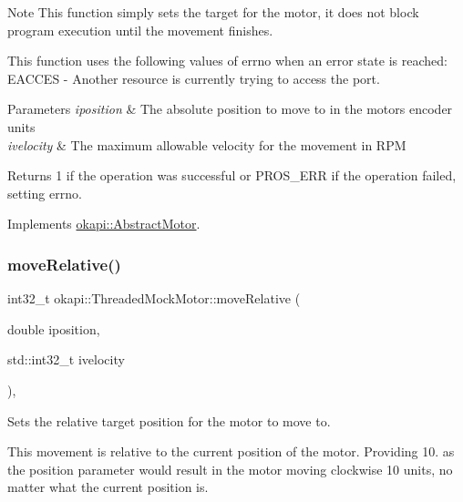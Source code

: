 \begin{DoxyNote}{Note}
This function simply sets the target for the motor, it does not block program execution until the movement finishes.
\end{DoxyNote}
This function uses the following values of errno when an error state is reached\+: E\+A\+C\+C\+ES -\/ Another resource is currently trying to access the port.


\begin{DoxyParams}{Parameters}
{\em iposition} & The absolute position to move to in the motor\textquotesingle{}s encoder units \\
\hline
{\em ivelocity} & The maximum allowable velocity for the movement in R\+PM \\
\hline
\end{DoxyParams}
\begin{DoxyReturn}{Returns}
1 if the operation was successful or P\+R\+O\+S\+\_\+\+E\+RR if the operation failed, setting errno. 
\end{DoxyReturn}


Implements \mbox{\hyperlink{classokapi_1_1AbstractMotor_ab84ff0f3e39fa14dcf74bcc867863ff8}{okapi\+::\+Abstract\+Motor}}.

\mbox{\label{classokapi_1_1ThreadedMockMotor_a3431a448097d84997a8d727f6be2ceac}} 
\subsubsection{\texorpdfstring{moveRelative()}{moveRelative()}}
{\footnotesize\ttfamily int32\+\_\+t okapi\+::\+Threaded\+Mock\+Motor\+::move\+Relative (\begin{DoxyParamCaption}\item[{double}]{iposition,  }\item[{std\+::int32\+\_\+t}]{ivelocity }\end{DoxyParamCaption})\hspace{0.3cm}{\ttfamily [override]}, {\ttfamily [virtual]}}



Sets the relative target position for the motor to move to. 

This movement is relative to the current position of the motor. Providing 10. as the position parameter would result in the motor moving clockwise 10 units, no matter what the current position is.

